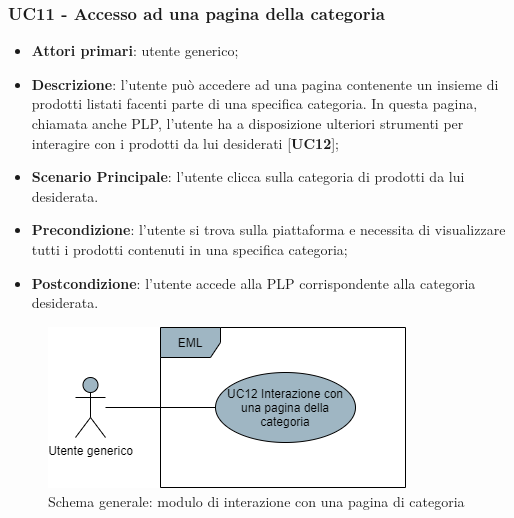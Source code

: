\subsubsection{UC11 - Accesso ad una pagina della categoria}
\begin{itemize}
\item \textbf{Attori primari}: utente generico;
\item \textbf{Descrizione}: l'utente può accedere ad una pagina contenente un insieme di prodotti listati facenti parte di una specifica categoria. In questa pagina, chiamata anche PLP, l'utente ha a disposizione ulteriori strumenti per interagire con i prodotti da lui desiderati [\textbf{UC12}];
\item \textbf{Scenario Principale}: l'utente clicca sulla categoria di prodotti da lui desiderata.
\item \textbf{Precondizione}: l'utente si trova sulla piattaforma e necessita di visualizzare tutti i prodotti contenuti in una specifica categoria;
\item \textbf{Postcondizione}: l'utente accede alla PLP corrispondente alla categoria desiderata.
\end{itemize}
\begin{figure}[H]
\centering
\includegraphics[scale=0.6]{res/UseCase/Immagini/InterazionePaginaCategoriaGenerale}
\caption{Schema generale: modulo di interazione con una pagina di categoria}
\end{figure}